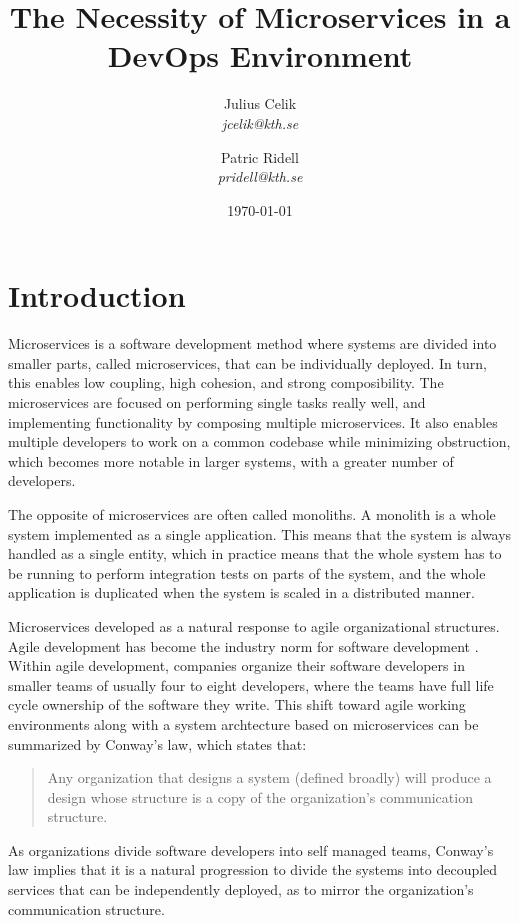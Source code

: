 \documentclass[a4paper]{article}
\title{The Necessity of Microservices in a DevOps Environment}
\author{
{Julius Celik}\\
\textit{
    jcelik@kth.se
} \and {Patric Ridell}\\
\textit{
    pridell@kth.se
}}
\date{\today{}}
\begin{document}
\maketitle


\section{Introduction}
Microservices is a software development method where systems are divided into smaller parts, called microservices, that can be individually deployed. In turn, this enables low coupling, high cohesion, and strong composibility. The microservices are focused on performing single tasks really well, and implementing functionality by composing multiple microservices. It also enables multiple developers to work on a common codebase while minimizing obstruction, which becomes more notable in larger systems, with a greater number of developers.

The opposite of microservices are often called monoliths. A monolith is a whole system implemented as a single application. This means that the system is always handled as a single entity, which in practice means that the whole system has to be running to perform integration tests on parts of the system, and the whole application is duplicated when the system is scaled in a distributed manner.

Microservices developed as a natural response to agile organizational structures. Agile development has become the industry norm for software development \cite{Jeremiah}. Within agile development, companies organize their software developers in smaller teams of usually four to eight developers, where the teams have full life cycle ownership of the software they write. This shift toward agile working environments along with a system archtecture based on microservices can be summarized by Conway's law, which states that:
\begin{quote}
    Any organization that designs a system (defined broadly) will produce a design whose structure is a copy of the organization's communication structure. \cite{Conway}
\end{quote}

As organizations divide software developers into self managed teams, Conway's law implies that it is a natural progression to divide the systems into decoupled services that can be independently deployed, as to mirror the organization's communication structure.
\end{document}
